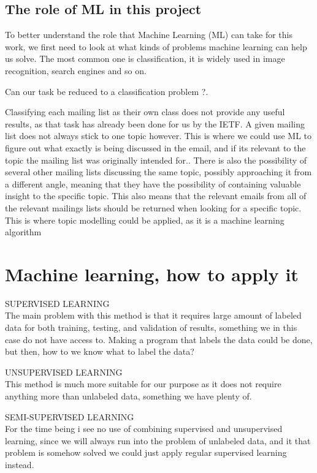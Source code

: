 \documentclass{report}
\begin{document}
\section{The role of ML in this project}

To better understand the role that Machine Learning (ML) can take for this work, we first need to look at what kinds of problems machine learning can help us solve. The most common one is classification, it is widely used in image recognition, search engines and so on. 

Can our task be reduced to a classification problem ?.

Classifying each mailing list as their own class does not provide any useful results, as that task has already been done for us by the IETF. A given mailing list does not always stick to one topic however. This is where we could use ML to figure out what exactly is being discussed in the email, and if its relevant to the topic the mailing list was originally intended for..
There is also the possibility of several other mailing lists discussing the same topic, possibly approaching it from a different angle, meaning that they have the possibility of containing valuable insight to the specific topic. This also  means that the relevant emails from all of the relevant mailings lists should be returned when looking for a specific topic.
This is where topic modelling could be applied, as it is a machine learning algorithm  

\chapter{Machine learning, how to apply it}
SUPERVISED LEARNING\\
The main problem with this method is that it requires large amount of labeled data for both training, testing, and validation of results, something we in this case do not have access to. Making a program that labels the data could be done, but then, how to we know what to label the data? 

UNSUPERVISED LEARNING\\
This method is much more suitable for our purpose as it does not require anything more than unlabeled data, something we have plenty of. 

SEMI-SUPERVISED LEARNING\\
For the time being i see no use of combining supervised and unsupervised learning, since we will always run into the problem of unlabeled data, and it that problem is somehow solved we could just apply regular supervised learning instead.
\end{document}
